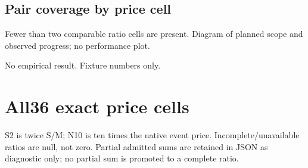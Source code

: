 \documentclass[10pt]{article}
\begin{document}
\subsection*{Pair coverage by price cell}
\par
Fewer than two comparable ratio cells are present. Diagram of planned scope and observed progress; no performance plot.\par
No empirical result. Fixture numbers only.\par
\newpage\section*{All36 exact price cells}
S2 is twice S/M; N10 is ten times the native event price. Incomplete/unavailable ratios are null, not zero. Partial admitted sums are retained in JSON as diagnostic only; no partial sum is promoted to a complete ratio.\par
\end{document}
